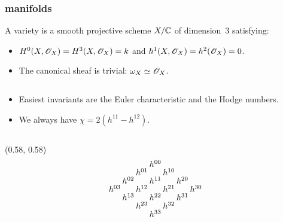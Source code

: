 \begin{frame}
\frametitle{\CY manifolds}

\begin{definition}%
    A \alert{\CY variety} is a smooth projective scheme $X/\mathbb C$ of dimension~$3$ satisfying:
    \begin{itemize}
    	\item
	    $H^0(X,\mathscr{O}_X)=H^3(X,\mathscr{O}_X)=k$ and $h^1(X,\mathscr{O}_X)=h^2(\mathscr{O}_X)=0$.

	    \item
	    The canonical sheaf is trivial: $\omega_X \simeq \mathscr{O}_X$. 
    \end{itemize}
\end{definition}

\unskip
\begin{columns}[onlytextwidth]
    \begin{column}{0.6\textwidth}
        \begin{itemize}
	        \item
	        Easiest invariants are the Euler characteristic and the Hodge numbers.

            \item
            We always have $\chi = 2(h^{11}-h^{12})$. 
        \end{itemize}
    \end{column}
\end{columns}

{
    \begin{textblock}{0.4}(0.58, 0.58)
        \[
            \arraycolsep = 1pt
            \def\arraystretch{0.5}
            \begin{array}[c]{ccccccc}
                &&& h^{00}                               \\  
                &&  h^{01} && h^{10}                     \\
                &   h^{02} && h^{11} && h^{20}           \\
                    h^{03} && h^{12} && h^{21} && h^{30} \\
                &   h^{13} && h^{22} && h^{31}           \\
                &&  h^{23} && h^{32}                     \\
                &&& h^{33} 
            \end{array}
        \]  
    \end{textblock}
}


\end{frame}
